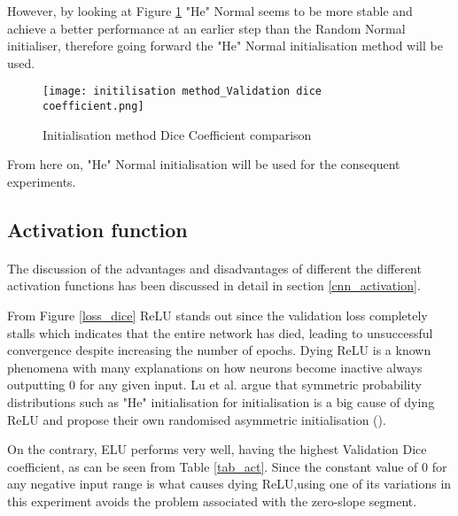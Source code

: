 However, by looking at Figure \ref{init_dice} "He" Normal seems to be more stable and achieve a better performance at an earlier step than the Random Normal initialiser, therefore going forward the "He" Normal initialisation method will be used.

\begin{figure}[hbt!]
    \centering
    \texttt{[image: initilisation method\_Validation dice coefficient.png]}
    \caption{Initialisation method Dice Coefficient comparison}
    \label{init_dice}
\end{figure}    

From here on, "He" Normal initialisation will be used for the consequent experiments.

\subsection{Activation function}
\paragraph{}
The discussion of the advantages and disadvantages of different the different activation functions has been discussed in detail in section \ref{cnn_activation}.

From Figure \ref{loss_dice} \gls{ReLU} stands out since the validation loss completely stalls which indicates that the entire network has died, leading to unsuccessful convergence despite increasing the number of epochs. Dying \gls{ReLU} is a known phenomena with many explanations on how neurons become inactive always outputting $0$ for any given input. Lu et al. argue that symmetric probability distributions such as "He" initialisation for initialisation is a big cause of dying \gls{ReLU} and propose their own randomised asymmetric initialisation (\cite{Lu_2020}).

On the contrary, \gls{ELU} performs very well, having the highest Validation Dice coefficient, as can be seen from Table \ref{tab_act}. Since the constant value of $0$ for any negative input range is what causes dying \gls{ReLU},using one of its variations in this experiment avoids the problem associated with the zero-slope segment.

